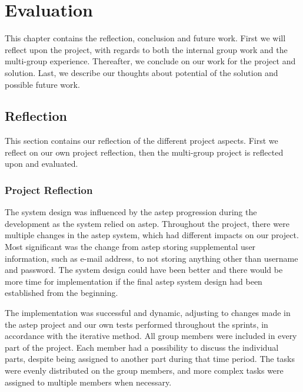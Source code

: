 \chapter{Evaluation}
This chapter contains the reflection, conclusion and future work.
First we will reflect upon the project, with regards to both the internal group work and the multi-group experience.
Thereafter, we conclude on our work for the project and solution.
Last, we describe our thoughts about potential of the solution and possible future work.

\section{Reflection}
This section contains our reflection of the different project aspects.
First we reflect on our own project reflection, then the multi-group project is reflected upon and evaluated.

\subsection{Project Reflection}
The system design was influenced by the \gls{astep} progression during the development as the system relied on \gls{astep}.
Throughout the project, there were multiple changes in the \gls{astep} system, which had different impacts on our project.
Most significant was the change from \gls{astep} storing supplemental user information, such as e-mail address, to not storing anything other than username and password.
The system design could have been better and there would be more time for implementation if the final \gls{astep} system design had been established from the beginning.

The implementation was successful and dynamic, adjusting to changes made in the \gls{astep} project and our own tests performed throughout the sprints, in accordance with the iterative method.
All group members were included in every part of the project.
Each member had a possibility to discuss the individual parts, despite being assigned to another part during that time period.
The tasks were evenly distributed on the group members, and more complex tasks were assigned to multiple members when necessary.

